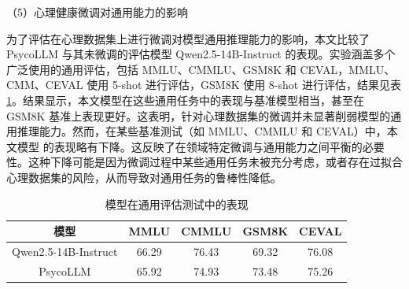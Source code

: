 \begin{table}[h]
    \centering
    \caption{不同模型在二级和三级心理咨询师考试中的表现}
\end{table}

（5）心理健康微调对通用能力的影响

为了评估在心理数据集上进行微调对模型通用推理能力的影响，本文比较了 PsycoLLM 与其未微调的评估模型 Qwen2.5-14B-Instruct 的表现。实验涵盖多个广泛使用的通用评估，包括 MMLU、CMMLU、GSM8K 和 CEVAL，MMLU、CMM、CEVAL 使用 5-shot 进行评估，GSM8K 使用 8-shot 进行评估，结果见表 \ref{tab:work1-模型在通用评估测试中的表现}。结果显示，本文模型在这些通用任务中的表现与基准模型相当，甚至在 GSM8K 基准上表现更好。这表明，针对心理数据集的微调并未显著削弱模型的通用推理能力。然而，在某些基准测试（如 MMLU、CMMLU 和 CEVAL）中，本文模型 的表现略有下降。这反映了在领域特定微调与通用能力之间平衡的必要性。这种下降可能是因为微调过程中某些通用任务未被充分考虑，或者存在过拟合心理数据集的风险，从而导致对通用任务的鲁棒性降低。

\begin{table}
  \centering
  \caption{模型在通用评估测试中的表现}
  \label{tab:work1-模型在通用评估测试中的表现}
  \begin{tabular}{ccccc}
    \toprule
    模型 & MMLU & CMMLU & GSM8K & CEVAL \\
    \midrule
    Qwen2.5-14B-Instruct & 66.29 & 76.43 & 69.32 & 76.08 \\
    PsycoLLM & 65.92 & 74.93 & 73.48 & 75.26 \\
    \bottomrule
  \end{tabular}
\end{table}

